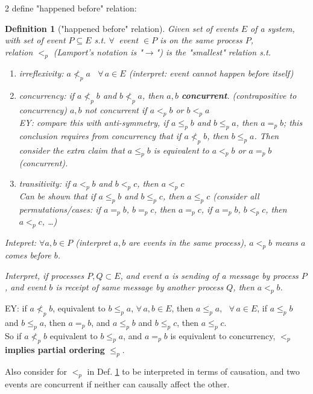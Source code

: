 \documentclass[10pt]{amsart}
\newtheorem{definition}{Definition}
\begin{document}
\begin{multicols*}{2}
define "happened before" relation:

\begin{definition}["happened before" relation]\label{Def:HappenedBeforePartialOrdering}
	Given set of events $E$ of a system, with set of event $P\subseteq E$ s.t. $\forall \, $ event $\in P$ is on the same process $P$, \\
	relation $ <_p$ (Lamport's notation is "$\to$") is the "smallest" relation s.t.
	
	\begin{enumerate}
		\item irreflexivity: $a \not<_p a$ \, $\forall\, a \in E$ (interpret: event cannot happen before itself)
		\item concurrency: if $a \not<_p b$ and $b\not<_p a$, then $a,b$ \textbf{concurrent}.
		(contrapositive to concurrency) $a,b$ not concurrent if $a <_p b$ or $b<_p a$ \\
		
		EY: compare this with anti-symmetry, if $a \leq_p b$ and $b\leq_p a$, then $a =_p b$; this conclusion requires from concurrency that if $a \not<_p b$, then $b\leq_p a$. Then consider the extra claim that $a\leq_p b$ is equivalent to $a <_p b$ or $a =_p b$ (concurrent).
		\item transitivity: if $a<_p b$ and $b<_p c$, then $a<_pc$ \\
		
		Can be shown that if $a\leq_p b$ and $b\leq_pc$, then $a\leq_p c$ (consider all permutations/cases: if $a=_p b$, $b=_pc$, then $a=_pc$, if $a=_p b$, $b<_p c$, then $a<_p c$, \dots)
	\end{enumerate}
Intepret: $\forall a, b \in P$ (interpret $a,b$ are events in the same process), $a<_p b$ means $a$ comes before $b$. 

Interpret, if processes $P, Q \subset E$, and event $a$ is sending of a message by process $P$, and event $b$ is receipt of same message by another process $Q$, then $a <_p b$.
\end{definition}

EY: if $a \not<_p b$, equivalent to $b \leq_p a$, $\forall \, a, b\in E$, then $a \leq_p a$, \, $\forall \, a \in E$, if $a\leq_p b$ and $b\leq_p a$, then $a=_p b$, and $a\leq_p b$ and $b\leq_p c$, then $a \leq_p c$. \\
So if $a \not<_p b$ equivalent to $b\leq_p a$, and $a=_p b$ is equivalent to concurrency, $<_p$ \textbf{implies partial ordering} $\leq_p$.

Also consider for $<_p$ in Def. \ref{Def:HappenedBeforePartialOrdering} to be interpreted in terms of causation, and two events are concurrent if neither can causally affect the other.


\end{multicols*}
\end{document}
